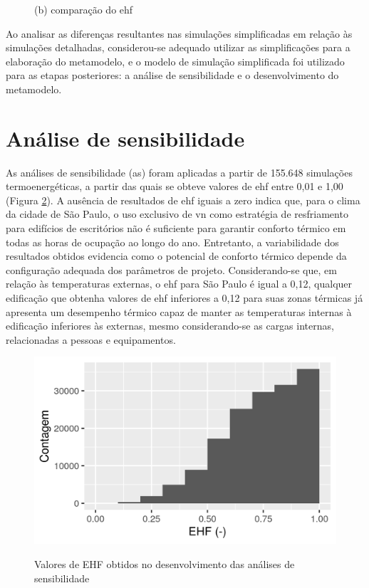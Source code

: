 \documentclass[brazil,hardcopy,openany]{ufscthesis} %
\begin{document}
\begin{figure}[h]
\begin{minipage}{.5\textwidth}
		\begin{center}
			\small{(b) comparação do \acrshort{ehf}}
		\end{center}
	\end{minipage}
	\label{fig:crack01}
\end{figure}

\phantom{Linha}

Ao analisar as diferenças resultantes nas simulações simplificadas em relação às simulações detalhadas, considerou-se adequado utilizar as simplificações para a elaboração do metamodelo, e o modelo de simulação simplificada foi utilizado para as etapas posteriores: a análise de sensibilidade e o desenvolvimento do metamodelo.

\newpage

\section{Análise de sensibilidade}

As análises de sensibilidade (\acrshort{as}) foram aplicadas a partir de 155.648 simulações termoenergéticas, a partir das quais se obteve valores de \acrshort{ehf} entre 0,01 e 1,00 (Figura \ref{fig:sobol_EHF}).
A ausência de resultados de \acrshort{ehf} iguais a zero indica que, para o clima da cidade de São Paulo, o uso exclusivo de \acrshort{vn} como estratégia de resfriamento para edifícios de escritórios não é suficiente para garantir conforto térmico em todas as horas de ocupação ao longo do ano. Entretanto, a variabilidade dos resultados obtidos evidencia como o potencial de conforto térmico depende da configuração adequada dos parâmetros de projeto.
Considerando-se que, em relação às temperaturas externas, o \acrshort{ehf} para São Paulo é igual a 0,12, qualquer edificação que obtenha valores de \acrshort{ehf} inferiores a 0,12 para suas zonas térmicas já apresenta um desempenho térmico capaz de manter as temperaturas internas à edificação inferiores às externas, mesmo considerando-se as cargas internas, relacionadas a pessoas e equipamentos.

\begin{figure}[h]
	\centering
	\caption{Valores de EHF obtidos no desenvolvimento das análises de sensibilidade}
	\includegraphics[width=.7\linewidth]{img/sobol_EHF.png}
	\label{fig:sobol_EHF}
\end{figure}
\end{document}
